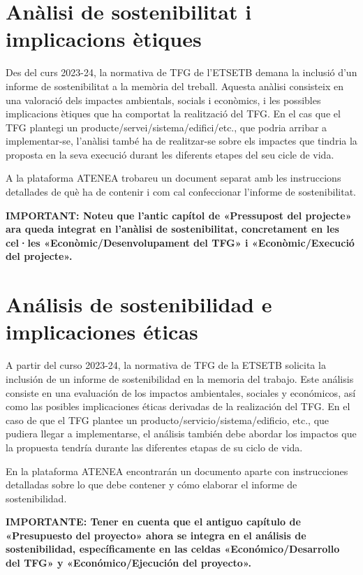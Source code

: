 
\ifcase\doclanguage\or
\chapter{Anàlisi de sostenibilitat i implicacions ètiques}
Des del curs 2023-24, la normativa de TFG de l'ETSETB demana la inclusió d'un informe de sostenibilitat a la memòria del treball. Aquesta anàlisi consisteix en una valoració dels impactes ambientals, socials i econòmics, i les possibles implicacions ètiques que ha comportat la realització del TFG. En el cas que el TFG plantegi un producte/servei/sistema/edifici/etc., que podria arribar a implementar-se, l’anàlisi també ha de realitzar-se sobre els impactes que tindria la proposta en la seva execució durant les diferents etapes del seu cicle de vida.

A la plataforma ATENEA trobareu un document separat amb les instruccions detallades de què ha de contenir i com cal confeccionar l'informe de sostenibilitat.

{\bigskip\bfseries {\large IMPORTANT:} Noteu que l'antic capítol de «Pressupost del projecte» ara queda integrat en l'anàlisi de sostenibilitat, concretament en les cel·les «Econòmic/Desenvolupament del TFG» i «Econòmic/Execució del projecte».}

\or
\chapter{Análisis de sostenibilidad e implicaciones éticas}
A partir del curso 2023-24, la normativa de TFG de la ETSETB solicita la inclusión de un informe de sostenibilidad en la memoria del trabajo. Este análisis consiste en una evaluación de los impactos ambientales, sociales y económicos, así como las posibles implicaciones éticas derivadas de la realización del TFG. En el caso de que el TFG plantee un producto/servicio/sistema/edificio, etc., que pudiera llegar a implementarse, el análisis también debe abordar los impactos que la propuesta tendría durante las diferentes etapas de su ciclo de vida.

En la plataforma ATENEA encontrarán un documento aparte con instrucciones detalladas sobre lo que debe contener y cómo elaborar el informe de sostenibilidad.

{\bigskip\bfseries {\large IMPORTANTE:} Tener en cuenta que el antiguo capítulo de «Presupuesto del proyecto» ahora se integra en el análisis de sostenibilidad, específicamente en las celdas «Económico/Desarrollo del TFG» y «Económico/Ejecución del proyecto».}

